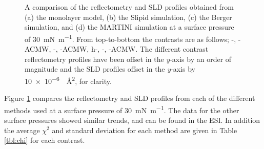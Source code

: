 \documentclass[amsmath,amssymb,twocolumn,superscriptaddress]{revtex4-1}
\begin{document}
\begin{figure}
 \caption{A comparison of the reflectometry and SLD profiles obtained from
 (a) the monolayer model, (b) the Slipid simulation, (c) the Berger
 simulation, and (d) the MARTINI simulation at a surface pressure of
 \SI{30}{\milli\newton\per\meter}. From top-to-bottom the contrasts are as
 follows; -, -ACMW, -,
 -ACMW, h-, -, -ACMW.
 The different contrast reflectometry profiles have been offset in the
 \emph{y}-axis by an order of magnitude and the SLD profiles offset in
 the \emph{y}-axis by \SI{10e-6}{\per\square\angstrom}, for clarity.}
 \label{fig:ref}
\end{figure}
%
Figure \ref{fig:ref} compares the reflectometry and SLD profiles from each
of the different methods used at a surface pressure of
\SI{30}{\milli\newton\per\meter}.
The data for the other surface pressures showed similar trends, and can be
found in the ESI.
In addition the average $\chi^2$ and standard deviation for each method are
given in Table \ref{tbl:chi} for each contrast.
%
\end{document}
